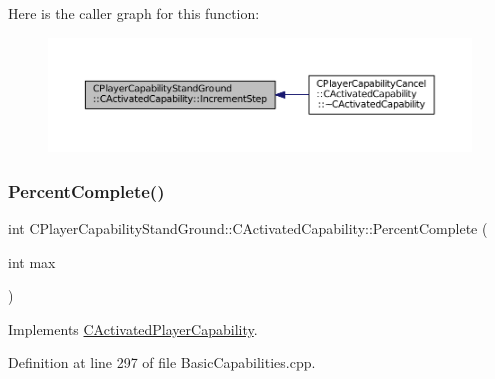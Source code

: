 Here is the caller graph for this function\+:
\nopagebreak
\begin{figure}[H]
\begin{center}
\leavevmode
\includegraphics[width=350pt]{classCPlayerCapabilityStandGround_1_1CActivatedCapability_ab4061171835e4c1008176e5765ded595_icgraph}
\end{center}
\end{figure}
\hypertarget{classCPlayerCapabilityStandGround_1_1CActivatedCapability_aa9bf1824e755460b699d81f866f2aadc}{}\label{classCPlayerCapabilityStandGround_1_1CActivatedCapability_aa9bf1824e755460b699d81f866f2aadc} 
\subsubsection{\texorpdfstring{Percent\+Complete()}{PercentComplete()}}
{\footnotesize\ttfamily int C\+Player\+Capability\+Stand\+Ground\+::\+C\+Activated\+Capability\+::\+Percent\+Complete (\begin{DoxyParamCaption}\item[{int}]{max }\end{DoxyParamCaption})\hspace{0.3cm}{\ttfamily [virtual]}}



Implements \hyperlink{classCActivatedPlayerCapability_a405dc6076058006a4f801727de4cfe4d}{C\+Activated\+Player\+Capability}.



Definition at line 297 of file Basic\+Capabilities.\+cpp.


